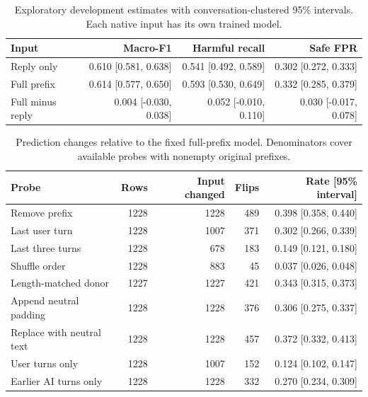 \begin{table}[htbp]
\centering
\caption{Exploratory development estimates with conversation-clustered 95\% intervals. Each native input has its own trained model.}
\begin{tabular}{lrrr}
\toprule
Input & Macro-F1 & Harmful recall & Safe FPR \\
\midrule
Reply only & 0.610 [0.581, 0.638] & 0.541 [0.492, 0.589] & 0.302 [0.272, 0.333] \\
Full prefix & 0.614 [0.577, 0.650] & 0.593 [0.530, 0.649] & 0.332 [0.285, 0.379] \\
Full minus reply & 0.004 [-0.030, 0.038] & 0.052 [-0.010, 0.110] & 0.030 [-0.017, 0.078] \\
\bottomrule
\end{tabular}
\end{table}

\begin{table}[htbp]
\centering
\caption{Prediction changes relative to the fixed full-prefix model. Denominators cover available probes with nonempty original prefixes.}
\begin{tabular}{lrrrr}
\toprule
Probe & Rows & Input changed & Flips & Rate [95\% interval] \\
\midrule
Remove prefix & 1228 & 1228 & 489 & 0.398 [0.358, 0.440] \\
Last user turn & 1228 & 1007 & 371 & 0.302 [0.266, 0.339] \\
Last three turns & 1228 & 678 & 183 & 0.149 [0.121, 0.180] \\
Shuffle order & 1228 & 883 & 45 & 0.037 [0.026, 0.048] \\
Length-matched donor & 1227 & 1227 & 421 & 0.343 [0.315, 0.373] \\
Append neutral padding & 1228 & 1228 & 376 & 0.306 [0.275, 0.337] \\
Replace with neutral text & 1228 & 1228 & 457 & 0.372 [0.332, 0.413] \\
User turns only & 1228 & 1007 & 152 & 0.124 [0.102, 0.147] \\
Earlier AI turns only & 1228 & 1228 & 332 & 0.270 [0.234, 0.309] \\
\bottomrule
\end{tabular}
\end{table}
